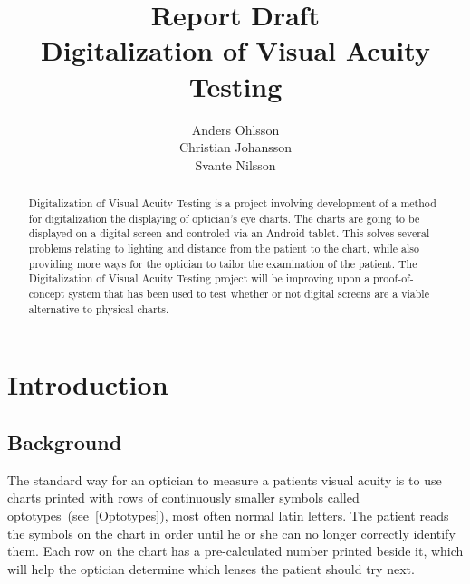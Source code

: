 \documentclass[12pt,a4paper,notitlepage]{report}
\begin{document}

\title{Report Draft\\Digitalization of Visual Acuity Testing}
\author{Anders Ohlsson\\Christian Johansson\\Svante Nilsson}
\maketitle

\begin{abstract}
Digitalization of Visual Acuity Testing is a project involving development of a method for digitalization the displaying of optician's eye charts. The charts are going to be displayed on a digital screen and controled via an Android tablet. This solves several problems relating to lighting and distance from the patient to the chart, while also providing more ways for the optician to tailor the examination of the patient. The Digitalization of Visual Acuity Testing project will be improving upon a proof-of-concept system that has been used to test whether or not digital screens are a viable alternative to physical charts.
\end{abstract}

\tableofcontents
\listoffigures
\clearpage

\setcounter{page}{1}
\chapter{Introduction}
\section{Background}

The standard way for an optician to measure a patients visual acuity is to use charts printed with rows of continuously smaller symbols called optotypes~(see~\ref{Optotypes}), most often normal latin letters. The patient reads the symbols on the chart in order until he or she can no longer correctly identify them. Each row on the chart has a pre-calculated number printed beside it, which will help the optician determine which lenses the patient should try next.
\end{document}
